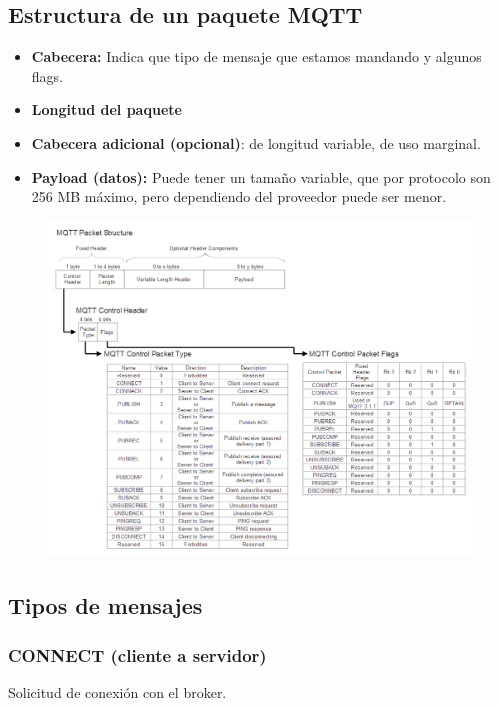 \documentclass[12pt, twoside, openright]{report} %
\begin{document}
\subsection{Estructura de un paquete MQTT}
\begin{itemize}
	\item \textbf{Cabecera:} Indica que tipo de mensaje que estamos mandando y algunos flags.
	\item \textbf{Longitud del paquete}
	\item \textbf{Cabecera adicional (opcional)}: de longitud variable, de uso marginal.
	\item \textbf{Payload (datos):} Puede tener un tamaño variable, que por protocolo son 256 MB máximo, pero dependiendo del proveedor puede ser menor.
\end{itemize}

\begin{figure}[H]
	{\includegraphics[scale=.5]{f4bd0f8a-2e92-4cdd-abfc-c7b067788d4a.png}}
\end{figure}

\subsection{Tipos de mensajes}
\subsubsection{CONNECT (cliente a servidor)}
Solicitud de conexión con el broker.
\end{document}
